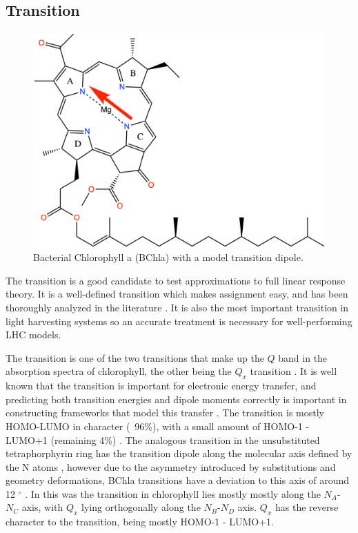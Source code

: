 \subsection{\Qy Transition}
\label{subsec:qy_transition}
\begin{figure}
    \centering
    \includegraphics{chapters/4_chl_xtb/chlorophyll_Qy.png}
    \caption{Bacterial Chlorophyll a (BChla) with a model \Qy transition dipole.}
    \label{fig:bchla_qy}
\end{figure}

The \Qy transition is a good candidate to test approximations to full linear response 
theory. It is a well-defined transition which makes assignment easy, and has been
thoroughly analyzed in the literature \cite{Strain1963, BelenOviedo2011, Zucchelli2002, Kim2020, Sirohiwal2020}. 
It is also the most important transition in light harvesting systems so an accurate 
treatment is necessary for well-performing LHC models.

The \Qy transition is one of the two transitions that make up the $Q$ band in the
absorption spectra of chlorophyll, the other being the $Q_x$ transition \cite{Sirohiwal2020}.
It is well known that the \Qy transition is important for electronic energy transfer, 
and predicting both transition energies and dipole moments correctly is important 
in constructing  frameworks that model this transfer \cite{Zazubovich2001}. The
\Qy transition is mostly HOMO-LUMO in character (~96\%), with a small amount of 
HOMO-1 - LUMO+1 (remaining 4\%) \cite{Saito2020}. The analogous transition in the 
unsubstituted tetraphorphyrin ring has the transition dipole along the molecular
axis defined by the N atoms \cite{Fragata1988}, however due to the asymmetry introduced
by substitutions and geometry deformations, BChla \Qy transitions have a deviation
to this axis of around 12 $^{\circ}$ \cite{BelenOviedo2011}. In this was the \Qy
transition in chlorophyll lies mostly mostly along the $N_A$-$N_C$ axis, with $Q_x$
lying orthogonally along the $N_B$-$N_D$ axis. $Q_x$ has the reverse character to
the \Qy transition, being mostly HOMO-1 - LUMO+1.

